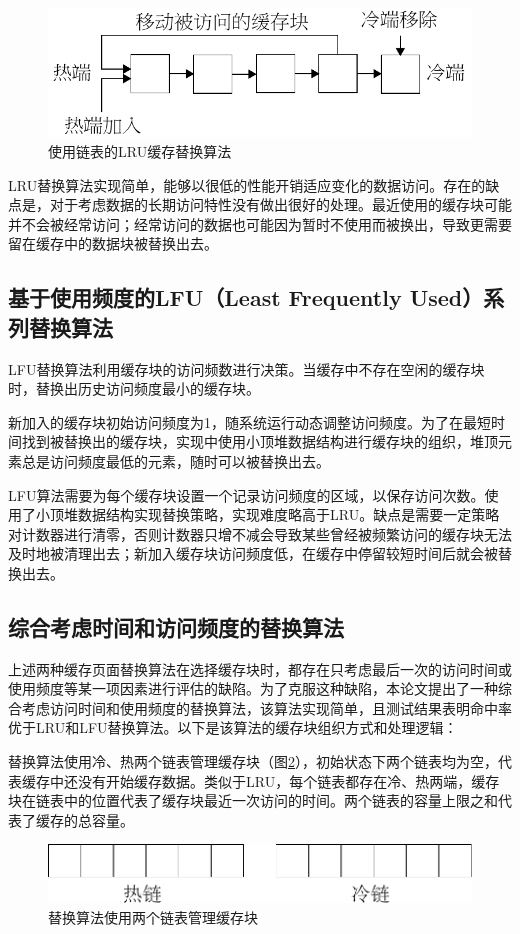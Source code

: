 \begin{figure}[!htb]
\centering
\includegraphics[width=0.6\linewidth]{./graph/replace-algo-lru}
\caption{使用链表的LRU缓存替换算法}
\label{fig:replace-algo-lru}
\end{figure}

LRU替换算法实现简单，能够以很低的性能开销适应变化的数据访问。存在的缺点是，对于考虑数据的长期访问特性没有做出很好的处理。最近使用的缓存块可能并不会被经常访问；经常访问的数据也可能因为暂时不使用而被换出，导致更需要留在缓存中的数据块被替换出去。

\subsection{基于使用频度的LFU（Least Frequently Used）系列替换算法}

LFU替换算法\cite{LFU}利用缓存块的访问频数进行决策。当缓存中不存在空闲的缓存块时，替换出历史访问频度最小的缓存块。

新加入的缓存块初始访问频度为1，随系统运行动态调整访问频度。为了在最短时间找到被替换出的缓存块，实现中使用小顶堆数据结构进行缓存块的组织，堆顶元素总是访问频度最低的元素，随时可以被替换出去。

LFU算法需要为每个缓存块设置一个记录访问频度的区域，以保存访问次数。使用了小顶堆数据结构实现替换策略，实现难度略高于LRU。缺点是需要一定策略对计数器进行清零，否则计数器只增不减会导致某些曾经被频繁访问的缓存块无法及时地被清理出去；新加入缓存块访问频度低，在缓存中停留较短时间后就会被替换出去。

\subsection{综合考虑时间和访问频度的替换算法}

上述两种缓存页面替换算法在选择缓存块时，都存在只考虑最后一次的访问时间或使用频度等某一项因素进行评估的缺陷。为了克服这种缺陷，本论文提出了一种综合考虑访问时间和使用频度的替换算法，该算法实现简单，且测试结果表明命中率优于LRU和LFU替换算法。以下是该算法的缓存块组织方式和处理逻辑：

替换算法使用冷、热两个链表管理缓存块（图\ref{fig:replace-algo-1}），初始状态下两个链表均为空，代表缓存中还没有开始缓存数据。类似于LRU，每个链表都存在冷、热两端，缓存块在链表中的位置代表了缓存块最近一次访问的时间。两个链表的容量上限之和代表了缓存的总容量。
\begin{figure}[!htb]
\centering
\includegraphics[width=0.6\linewidth]{./graph/replace-algo-1}
\caption{替换算法使用两个链表管理缓存块}
\label{fig:replace-algo-1}
\end{figure}

